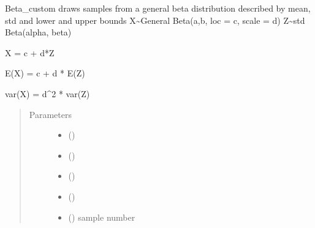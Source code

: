 \documentclass[letterpaper,10pt,english]{sphinxmanual}
\begin{document}
\begin{fulllineitems}
\label{\detokenize{helper_func:helper_func.Beta_custom}}
\sphinxAtStartPar
Beta\_custom draws samples from a general beta distribution described by mean, std and lower and upper   bounds
X\textasciitilde{}General Beta(a,b, loc = c, scale = d)
Z\textasciitilde{}std Beta(alpha, beta)

\sphinxAtStartPar
X = c + d*Z

\sphinxAtStartPar
E(X) = c + d * E(Z)

\sphinxAtStartPar
var(X) = d\textasciicircum{}2 * var(Z)
\begin{quote}\begin{description}
\item[{Parameters}] \leavevmode\begin{itemize}
\item {} 
\sphinxAtStartPar
{} () \textendash{} 

\item {} 
\sphinxAtStartPar
{} () \textendash{} 

\item {} 
\sphinxAtStartPar
{} (\sphinxstyleliteralemphasis{\sphinxupquote{, }}\sphinxstyleliteralemphasis{\sphinxupquote{(}}\sphinxstyleliteralemphasis{\sphinxupquote{)}}) \textendash{} 

\item {} 
\sphinxAtStartPar
{} (\sphinxstyleliteralemphasis{\sphinxupquote{, }}\sphinxstyleliteralemphasis{\sphinxupquote{(}}\sphinxstyleliteralemphasis{\sphinxupquote{)}}) \textendash{} 

\item {} 
\sphinxAtStartPar
{} () \textendash{} sample number


\end{itemize}
\end{description}
\end{quote}
\end{fulllineitems}
\end{document}
